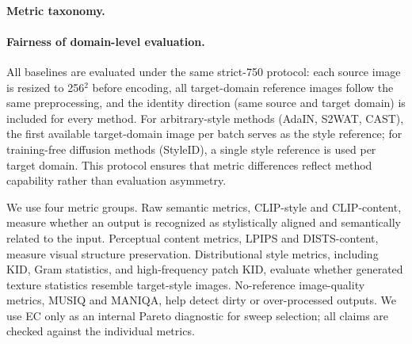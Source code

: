 ﻿\documentclass[letterpaper]{article}
\begin{document}
\paragraph{Metric taxonomy.}
\paragraph{Fairness of domain-level evaluation.}
All baselines are evaluated under the same strict-750 protocol: each source image is resized to 256$^2$ before encoding, all target-domain reference images follow the same preprocessing, and the identity direction (same source and target domain) is included for every method. For arbitrary-style methods (AdaIN, S2WAT, CAST), the first available target-domain image per batch serves as the style reference; for training-free diffusion methods (StyleID), a single style reference is used per target domain. This protocol ensures that metric differences reflect method capability rather than evaluation asymmetry.

We use four metric groups. Raw semantic metrics, CLIP-style and CLIP-content, measure whether an output is recognized as stylistically aligned and semantically related to the input. Perceptual content metrics, LPIPS and DISTS-content, measure visual structure preservation. Distributional style metrics, including KID, Gram statistics, and high-frequency patch KID, evaluate whether generated texture statistics resemble target-style images. No-reference image-quality metrics, MUSIQ and MANIQA, help detect dirty or over-processed outputs. We use EC only as an internal Pareto diagnostic for sweep selection; all claims are checked against the individual metrics.
\end{document}

